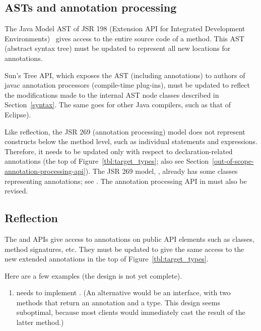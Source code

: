 \documentclass[10pt]{article}
\begin{document}
\subsection{ASTs and annotation processing}

The Java Model AST of JSR 198 (Extension API for Integrated Development
Environments)~\cite{JSR198} gives access to the entire source code of a
method.  This AST (abstract syntax tree) must be updated to represent all
new locations for annotations.

Sun's Tree API, which exposes the AST (including annotations) to authors of
javac annotation processors (compile-time plug-ins), must be updated to
reflect the modifications made to the internal AST node classes described in
Section~\ref{syntax}.
The same goes for other Java compilers, such as that of Eclipse).


\label{jsr269-changes}

Like reflection, the JSR 269 (annotation processing) model
does not represent constructs below the
method level, such as individual statements and expressions.  Therefore, it
needs to be updated only with respect to declaration-related annotations
(the top of Figure~\ref{tbl:target_types}; also see Section~\ref{out-of-scope-annotation-processing-api}).
The JSR 269 model, ,
already has some classes representing annotations; see
.
The annotation processing API in  must
also be revised.




\subsection{Reflection\label{reflection}}

The  and  APIs give access
to annotations on public API elements such as classes,
method signatures, etc.  They must be updated to give the same
access to the new extended annotations in the top of
Figure~\ref{tbl:target_types}.

Here are a few examples (the design is not yet complete).

\begin{enumerate}
\item
{} needs to implement
.
(An alternative would be an 
interface, with two methods that return an annotation and a type.  This
design seems suboptimal, because most
clients would immediately cast the result of the latter method.)

\end{enumerate}
\end{document}
